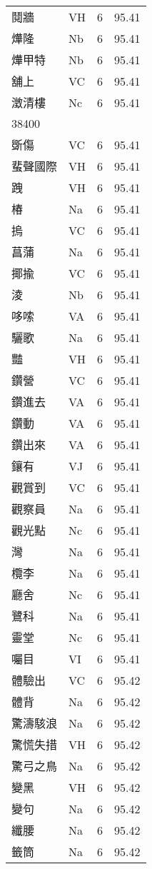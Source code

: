 \documentclass[twocolumn]{book}
\begin{document}
\begin{supertabular}{llrr}
鬩牆 & VH & 6 &  95.41\\
燁隆 & Nb & 6 &  95.41\\
燁甲特 & Nb & 6 &  95.41\\
舖上 & VC & 6 &  95.41\\
澂清樓 & Nc & 6 &  95.41\\
38400\\
斲傷 & VC & 6 &  95.41\\
蜚聲國際 & VH & 6 &  95.41\\
跩 & VH & 6 &  95.41\\
椿 & Na & 6 &  95.41\\
摀 & VC & 6 &  95.41\\
菖蒲 & Na & 6 &  95.41\\
揶揄 & VC & 6 &  95.41\\
淩 & Nb & 6 &  95.41\\
哆嗦 & VA & 6 &  95.41\\
驪歌 & Na & 6 &  95.41\\
豔 & VH & 6 &  95.41\\
鑽營 & VC & 6 &  95.41\\
鑽進去 & VA & 6 &  95.41\\
鑽動 & VA & 6 &  95.41\\
鑽出來 & VA & 6 &  95.41\\
鑲有 & VJ & 6 &  95.41\\
觀賞到 & VC & 6 &  95.41\\
觀察員 & Na & 6 &  95.41\\
觀光點 & Nc & 6 &  95.41\\
灣 & Na & 6 &  95.41\\
欖李 & Na & 6 &  95.41\\
廳舍 & Nc & 6 &  95.41\\
鷺科 & Na & 6 &  95.41\\
靈堂 & Nc & 6 &  95.41\\
囑目 & VI & 6 &  95.41\\
體驗出 & VC & 6 &  95.42\\
體背 & Na & 6 &  95.42\\
驚濤駭浪 & Na & 6 &  95.42\\
驚慌失措 & VH & 6 &  95.42\\
驚弓之鳥 & Na & 6 &  95.42\\
變黑 & VH & 6 &  95.42\\
變句 & Na & 6 &  95.42\\
纖腰 & Na & 6 &  95.42\\
籤筒 & Na & 6 &  95.42\\

\end{supertabular}
\end{document}
